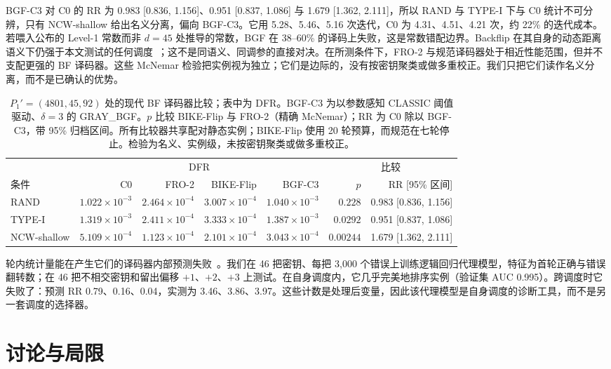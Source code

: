 \documentclass[UTF8,a4paper,10pt,twocolumn]{ctexart}
\begin{document}
BGF-C3 对 C0 的 RR 为 0.983 [0.836, 1.156]、0.951 [0.837, 1.086] 与 1.679 [1.362, 2.111]，所以 RAND 与 TYPE-I 下与 C0 统计不可分辨，只有 NCW-shallow 给出名义分离，偏向 BGF-C3。它用 5.28、5.46、5.16 次迭代，C0 为 4.31、4.51、4.21 次，约 22\% 的迭代成本。若喂入公布的 Level-1 常数而非 $d=45$ 处推导的常数，BGF 在 38--60\% 的译码上失败，这是常数错配边界。Backflip 在其自身的动态距离语义下仍强于本文测试的任何调度~\cite{sendrier2020lowdfr,vasseur2021thesis}；这不是同语义、同调参的直接对决。在所测条件下，FRO-2 与规范译码器处于相近性能范围，但并不支配更强的 BF 译码器。这些 McNemar 检验把实例视为独立；它们是边际的，没有按密钥聚类或做多重校正。我们只把它们读作名义分离，而不是已确认的优势。

\begin{table}[!t]
\centering
\small
\caption{$P_1'=(4801,45,92)$ 处的现代 BF 译码器比较；表中为 DFR。BGF-C3 为以参数感知 CLASSIC 阈值驱动、$\delta=3$ 的 GRAY\_BGF。$p$ 比较 BIKE-Flip 与 FRO-2（精确 McNemar）；RR 为 C0 除以 BGF-C3，带 95\% 归档区间。所有比较器共享配对静态实例；BIKE-Flip 使用 20 轮预算，而规范在七轮停止。检验为名义、实例级，未按密钥聚类或做多重校正。}
\label{tab:modern}
\begin{tabular}{lrrrrrr}
\toprule
 & \multicolumn{4}{c}{DFR} & \multicolumn{2}{c}{比较} \\
\cmidrule(lr){2-5} \cmidrule(lr){6-7}
条件 & C0 & FRO-2 & BIKE-Flip & BGF-C3 & $p$ & RR [95\% 区间] \\
\midrule
RAND & $1.022\times10^{-3}$ & $2.464\times10^{-4}$ & $3.007\times10^{-4}$ & $1.040\times10^{-3}$ & $0.228$ & 0.983 [0.836, 1.156] \\
TYPE-I & $1.319\times10^{-3}$ & $2.411\times10^{-4}$ & $3.333\times10^{-4}$ & $1.387\times10^{-3}$ & $0.0292$ & 0.951 [0.837, 1.086] \\
NCW-shallow & $5.109\times10^{-4}$ & $1.123\times10^{-4}$ & $2.101\times10^{-4}$ & $3.043\times10^{-4}$ & $0.00244$ & 1.679 [1.362, 2.111] \\
\bottomrule
\end{tabular}
\end{table}
\label{sec:counterfactual}
轮内统计量能在产生它们的译码器内部预测失败~\cite{kim2021logistic,paiva2022pickyfix}。我们在 46 把密钥、每把 3,000 个错误上训练逻辑回归代理模型，特征为首轮正确与错误翻转数；在 46 把不相交密钥和留出偏移 $+1$、$+2$、$+3$ 上测试。在自身调度内，它几乎完美地排序实例（验证集 AUC 0.995）。跨调度时它失败了：预测 RR 0.79、0.16、0.04，实测为 3.46、3.86、3.97。这些计数是处理后变量，因此该代理模型是自身调度的诊断工具，而不是另一套调度的选择器。
\section{讨论与局限}\label{sec:discussion}
\end{document}
